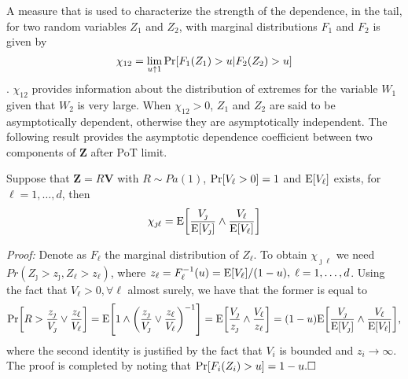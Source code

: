 A measure that is used to characterize the strength of the dependence,
in the tail, for two random variables $Z_1$ and $Z_2$, with marginal
distributions $F_1$ and $F_2$ is given by
\[	\chi_{12} = \lim_{u\uparrow 1} \prob{F_1(Z_1)>u|F_2(Z_2)>u}  \]
\citep{coles2001}.
$\chi_{12}$ provides information about the distribution of extremes for the variable $W_1$
given that $W_2$ is very large.  When $\chi_{12}>0$, $Z_1$ and $Z_2$ 
are said to
be asymptotically dependent, otherwise they are asymptotically
independent. The following result provides the asymptotic dependence coefficient between two components of $\bm{Z}$
after PoT limit. 
\begin{prop}\label{ppchi}
Suppose that $\bm{Z} = R\bm{V}$ with $R\sim Pa(1)$,
$\prob{V_\ell > 0} = 1$ and $\expect{V_\ell}$ exists, for $\ell=1, \ldots ,d$, then
\begin{equation}
    \label{eqn:chi_ij}
	\chi_{\jmath\ell} = \expect{\frac{V_\jmath}{\expect{V_\jmath}} \wedge \frac{V_\ell}{\expect{V_\ell}}}
\end{equation}
\end{prop}
{\em Proof:}
Denote as $F_\ell$ the marginal distribution of $Z_\ell$. To obtain $\chi_{\jmath\ell}$ we need $Pr(Z_\jmath>z_\jmath,Z_\ell>z_\ell)$, where $z_\ell =
F_\ell^{-1}(u) = \expect{V_\ell}/(1 - u), \;\ell=1,\dots, d$.
Using the fact that
$V_\ell>0, \forall \ell$ almost surely, we have that the former is equal to
\begin{equation*}
\prob{R>\frac{z_\jmath}{V_\jmath}\vee\frac{z_\ell}{V_\ell}}
    = \expect{1\wedge\left(\frac{z_\jmath}{V_\jmath}\vee\frac{z_\ell}{V_\ell}\right)^{-1}}
    = \expect{\frac{V_\jmath}{z_\jmath}\wedge\frac{V_\ell}{z_\ell}}
    = (1 - u)\expect{\frac{V_\jmath}{\expect{V_\jmath}}\wedge\frac{V_\ell}{\expect{V_\ell}}},
\end{equation*}
where the second identity is justified by the fact that $V_i$ is
bounded and $z_i\rightarrow\infty$. The proof is completed by noting
that $\prob{F_i(Z_i)>u} = 1 - u.\hfill\Box$

